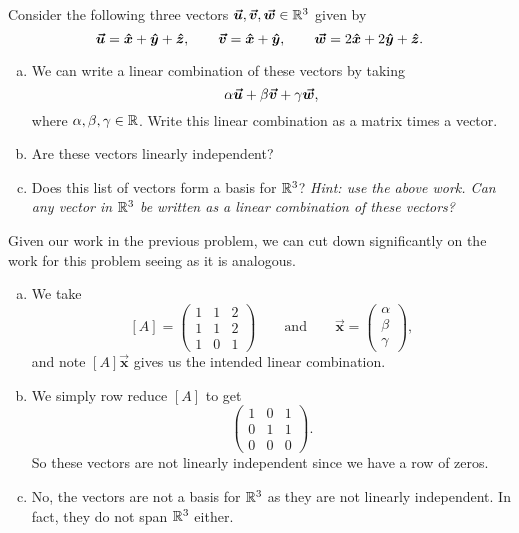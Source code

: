 \documentclass[12pt]{article} %
\newcommand{\vecx}{\boldsymbol{\vec{x}}}
\begin{document}
\newpage
\begin{problem}
Consider the following three vectors $\boldsymbol{\boldsymbol{\vec{u}}},\boldsymbol{\boldsymbol{\vec{v}}},\boldsymbol{\boldsymbol{\vec{w}}}\in \mathbb{R}^3$ given by
\[
\boldsymbol{\boldsymbol{\vec{u}}} = \boldsymbol{\hat{x}} + \boldsymbol{\hat{y}} +\boldsymbol{\hat{z}}, \qquad \boldsymbol{\boldsymbol{\vec{v}}} = \boldsymbol{\hat{x}} + \boldsymbol{\hat{y}}, \qquad \boldsymbol{\boldsymbol{\vec{w}}} = 2\boldsymbol{\hat{x}} + 2\boldsymbol{\hat{y}} +\boldsymbol{\hat{z}}. 
\]
\begin{enumerate}[(a)]
    \item We can write a linear combination of these vectors by taking
    \[
    \alpha \boldsymbol{\boldsymbol{\vec{u}}} + \beta \boldsymbol{\boldsymbol{\vec{v}}} + \gamma \boldsymbol{\boldsymbol{\vec{w}}},
    \]
    where $\alpha,\beta,\gamma \in \mathbb{R}$.  Write this linear combination as a matrix times a vector.
    \item Are these vectors linearly independent?
    \item Does this list of vectors form a basis for $\mathbb{R}^3$? \emph{Hint: use the above work. Can any vector in $\mathbb{R}^3$ be written as a linear combination of these vectors?}
\end{enumerate}
\end{problem}
\begin{solution}
Given our work in the previous problem, we can cut down significantly on the work for this problem seeing as it is analogous.
    \begin{enumerate}[(a)]
        \item We take
        \[
            [A] = \begin{pmatrix} 1 & 1 & 2 \\ 1 & 1 & 2 \\ 1 & 0 & 1 \end{pmatrix} \qquad \textrm{and} \qquad \vecx = \begin{pmatrix} \alpha \\ \beta \\ \gamma \end{pmatrix},
        \]
        and note $[A]\vecx$ gives us the intended linear combination.
        
        \item We simply row reduce $[A]$ to get 
        \[
        \begin{pmatrix} 1 & 0 & 1 \\ 0 & 1 & 1 \\ 0 & 0 & 0 \end{pmatrix}.
        \]
        So these vectors are not linearly independent since we have a row of zeros.
        \item No, the vectors are not a basis for $\mathbb{R}^3$ as they are not linearly independent. In fact, they do not span $\mathbb{R}^3$ either.
    \end{enumerate}
\end{solution}
\end{document}
